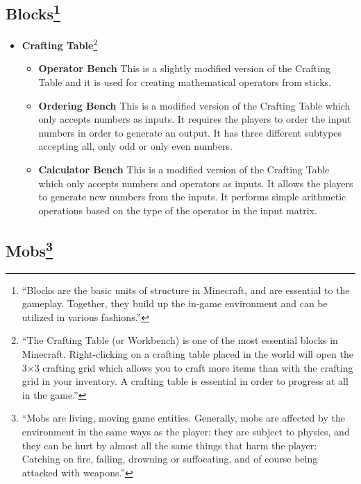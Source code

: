 \subsection[Blocks]{Blocks\footnote{``Blocks are the basic units of structure in Minecraft, and are essential to the gameplay. Together, they build up the in-game environment and can be utilized in various fashions.''\cite{website:minecraft-blocks}}}

\begin{itemize}
\large \item \textbf{Crafting Table}\footnote{``The Crafting Table (or Workbench) is one of the most essential blocks in Minecraft. Right-clicking on a crafting table placed in the world will open the 3×3 crafting grid which allows you to craft more items than with the crafting grid in your inventory. A crafting table is essential in order to progress at all in the game.''\cite{website:minecraft-table}}

\normalsize
\begin{itemize}
\item \textbf{Operator Bench}
\newline
\normalsize This is a slightly modified version of the Crafting Table and it is used for creating mathematical operators from sticks.

\item \textbf{Ordering Bench}
\newline
\normalsize This is a modified version of the Crafting Table which only accepts numbers as inputs. It requires the players to order the input numbers in order to generate an output. It has three different subtypes accepting all, only odd or only even numbers.

\item \textbf{Calculator Bench}
\newline
\normalsize This is a modified version of the Crafting Table which only accepts numbers and operators as inputs. It allows the players to generate new numbers from the inputs. It performs simple arithmetic operations based on the type of the operator in the input matrix.
\end{itemize}
\end{itemize}

\subsection[Mobs]{Mobs\footnote{``Mobs are living, moving game entities. Generally, mobs are affected by the environment in the same ways as the player: they are subject to physics, and they can be hurt by almost all the same things that harm the player: Catching on fire, falling, drowning or suffocating, and of course being attacked with weapons.''\cite{website:minecraft-mobs}}}

